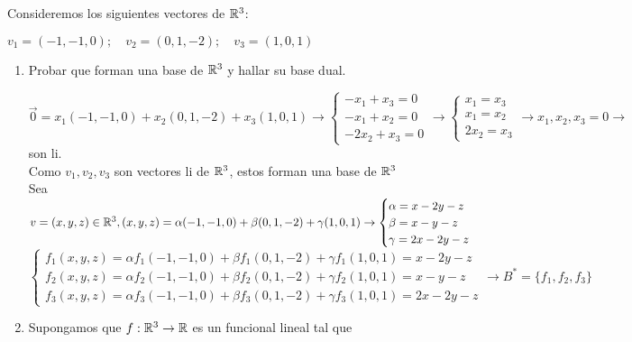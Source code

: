 \item Consideremos los siguientes vectores de $\mathbb{R}^3$:
    \begin{center}
        $v_1=(-1,-1,0); \quad v_2=(0,1,-2);\quad v_3=(1,0,1)$
    \end{center}
    \begin{enumerate}
        \item Probar que forman una base de $\mathbb{R}^3$ y hallar su base dual.
            \begin{mdframed}[style=s]
                $\vec{0}=x_1(-1,-1,0)+x_2(0,1,-2)+x_3(1,0,1)\to \begin{cases}
                    -x_1+x_3=0\\
                    -x_1+x_2=0\\
                    -2x_2+x_3=0
                \end{cases}\to\begin{cases}
                    x_1=x_3\\
                    x_1=x_2\\
                    2x_2=x_3
                \end{cases}\to x_1,x_2,x_3=0\to$ son li.\\
                Como $v_1,v_2,v_3$ son vectores li de $\mathbb{R}^3$, estos forman una base de $\mathbb{R}^3$\\
                Sea $v=(x,y,z)\in\mathbb{R}^3,(x,y,z)=\alpha(-1,-1,0)+\beta(0,1,-2)+\gamma(1,0,1)\to\begin{cases}
                    \alpha=x-2y-z\\
                    \beta=x-y-z\\
                    \gamma=2x-2y-z
                \end{cases}$\\
                $\begin{cases}
                    f_1(x,y,z)=\alpha f_1(-1,-1,0)+\beta f_1(0,1,-2)+\gamma f_1(1,0,1)=x-2y-z\\
                    f_2(x,y,z)=\alpha f_2(-1,-1,0)+\beta f_2(0,1,-2)+\gamma f_2(1,0,1)=x-y-z\\
                    f_3(x,y,z)=\alpha f_3(-1,-1,0)+\beta f_3(0,1,-2)+\gamma f_3(1,0,1)=2x-2y-z
                \end{cases}\to B^*=\{f_1,f_2,f_3\}$
            \end{mdframed}
        \item Supongamos que $f:\mathbb{R}^3\to\mathbb{R}$ es un funcional lineal tal que
            \begin{center}

\end{center}
\end{enumerate}
